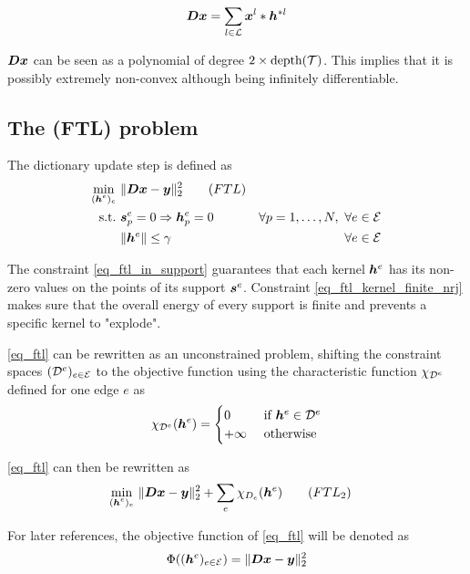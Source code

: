 \begin{align}
	\bm{D}\bm{x} = \sum_{l \in \mathcal L} \bm{x}^l * \bm{h}^{*l}	 \label{eq_Dx_as_convolution}
\end{align}

$\bm{D}\bm{x}$ can be seen as a polynomial of degree $2 \times \text{depth}(\mathcal T)$. This implies that it is possibly extremely non-convex although being infinitely differentiable.

\subsection{The (FTL) problem}

The dictionary update step is defined as 
\begin{align}
\underset{\substack{(\bm{h}^e)_{e}}}\min ~ & \lVert \bm{D}\bm{x} - \bm{y} \rVert_2^2 \tag{$FTL$} \label{eq_ftl}\\
\text{s.t.~} & \bm{s}^e_p=0 \Rightarrow \bm{h}^e_p = 0 \quad & \forall p=1,\dots,N ,~\forall e \in \mathcal E \label{eq_ftl_in_support} \\
 & \lVert \bm{h}^e \rVert \le \gamma & \forall e \in \mathcal E\label{eq_ftl_kernel_finite_nrj}
\end{align}

The constraint \ref{eq_ftl_in_support} guarantees that each kernel $\bm{h}^e$ has its non-zero values on the points of its support $\bm{s}^e$. Constraint \ref{eq_ftl_kernel_finite_nrj} makes sure that the overall energy of every support is finite and prevents a specific kernel to "explode".

\eqref{eq_ftl} can be rewritten as an unconstrained problem, shifting the constraint spaces $({\mathcal D}^e)_{e \in \mathcal E}$ to the objective function using the characteristic function $\chi_{{\mathcal D}^e}$ defined for one edge $e$ as
$$\chi_{\Dspace^e}(\h^e) = \begin{cases} 0 &\text{ if } \h^e \in \Dspace^e \\ +\infty & \ \text{otherwise}\end{cases}$$

\eqref{eq_ftl} can then be rewritten as
\begin{align}
\underset{\substack{(\bm{h}^e)_{e}}}\min ~ & \lVert \bm{D}\bm{x} - \bm{y} \rVert_2^2 + \sum_{e}\chi_{D_e} (\bm{h}^e) \tag{$FTL_2$} \label{eq_ftl2}
\end{align}

For later references, the objective function of \eqref{eq_ftl} will be denoted as
\begin{align}
\Phi((\bm{h}^e)_{e \in \mathcal E}) = \lVert \bm{D}\bm{x}-\bm{y} \rVert^2_2
\end{align}

